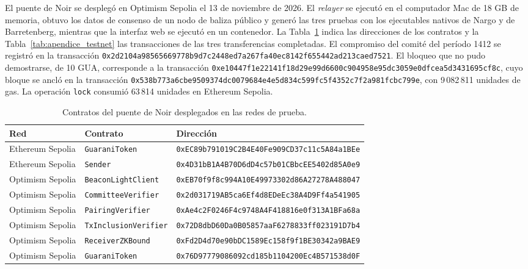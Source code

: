 El puente de Noir se desplegó en Optimism Sepolia el 13 de noviembre de 2026. El
\textit{relayer} se ejecutó en el computador Mac de 18 GB de memoria, obtuvo los datos de consenso
de un nodo de baliza público y generó las tres pruebas con los ejecutables nativos de Nargo y de
Barretenberg, mientras que la interfaz web se ejecutó en un contenedor. La
Tabla~\ref{tab:apendice_testnet_contratos} indica las direcciones de los contratos y la
Tabla~\ref{tab:apendice_testnet} las transacciones de las tres transferencias completadas. El
compromiso del comité del período 1412 se registró en la transacción
\texttt{0x2d2104a98565669778b9d7}\allowbreak\texttt{c2448ed7a267fa40ec8142}\allowbreak\texttt{f655442ad213caed7521}.
El bloqueo que no pudo demostrarse, de 10 GUA, corresponde a la transacción
\texttt{0xe10447f1e22141f18d29e9}\allowbreak\texttt{9d6600c904958e95dc3059}\allowbreak\texttt{e0dfcea5d3431695cf8c},
cuyo bloque se ancló en la transacción
\texttt{0x538b773a6cbe9509374dc0}\allowbreak\texttt{079684e4e5d834c599fc5f}\allowbreak\texttt{4352c7f2a981fcbc799e},
con 9\,082\,811 unidades de gas. La operación \lstinline|lock| consumió 63\,814 unidades en
Ethereum Sepolia.

\begin{table}[htbp]
	\centering
	\caption{Contratos del puente de Noir desplegados en las redes de prueba.}
	\label{tab:apendice_testnet_contratos}
	\footnotesize
	\begin{tabular}{>{\raggedright\arraybackslash}p{2.3cm} >{\raggedright\arraybackslash}p{3.9cm} >{\raggedright\arraybackslash}p{8.4cm}}
		\toprule
		\textbf{Red} & \textbf{Contrato} & \textbf{Dirección} \\
		\midrule
		Ethereum Sepolia & \texttt{GuaraniToken} & \texttt{0xEC89b791019C2B4E40Fe909CD37c11c5A84a1BEe} \\
		Ethereum Sepolia & \texttt{Sender} & \texttt{0x4D31bB1A4B70D6dD4c57b01CBbcEE5402d85A0e9} \\
		Optimism Sepolia & \texttt{BeaconLightClient} & \texttt{0xEB70f9f8c994A10E49973302d86A27278A488047} \\
		Optimism Sepolia & \texttt{CommitteeVerifier} & \texttt{0x2d031719AB5ca6Ef4d8EDeEc38A4D9Ff4a541905} \\
		Optimism Sepolia & \texttt{PairingVerifier} & \texttt{0xAe4c2F0246F4c9748A4F418816e0f313A1BFa68a} \\
		Optimism Sepolia & \texttt{TxInclusionVerifier} & \texttt{0x72D8dbD60Da0B05857aaF6278833ff023191D7b4} \\
		Optimism Sepolia & \texttt{ReceiverZKBound} & \texttt{0xFd2D4d70e90bDC1589Ec158f9f1BE30342a9BAE9} \\
		Optimism Sepolia & \texttt{GuaraniToken} & \texttt{0x76D97779086092cd185b1104200Ec4B571538d0F} \\
		\bottomrule
	\end{tabular}
\end{table}

